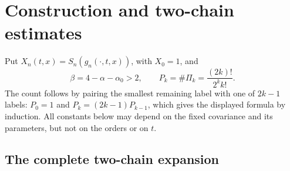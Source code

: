 \documentclass[12pt,oneside,openany]{book}
\numberwithin{equation}{section}
\theoremstyle{nogostyle}
\theoremstyle{definition}
\begin{document}










\chapter{Construction and two-chain estimates}\label{S:G0}



Put $X_n(t,x) = S_n(g_n(\cdot,t,x))$, with $X_0 = 1$, and
\[
  \beta=4-\alpha-\alpha_0>2,\qquad
  P_k=\#\Pi_k=\frac{(2k)!}{2^k k!}.
\]
The count follows by pairing the smallest remaining label with one of $2k-1$
labels: $P_0 = 1$ and $P_k = (2k-1)P_{k-1}$, which gives the displayed formula
by induction. All constants below may depend on the fixed covariance and its
parameters, but not on the orders or on $t$.

\section{The complete two-chain expansion}
\end{document}
